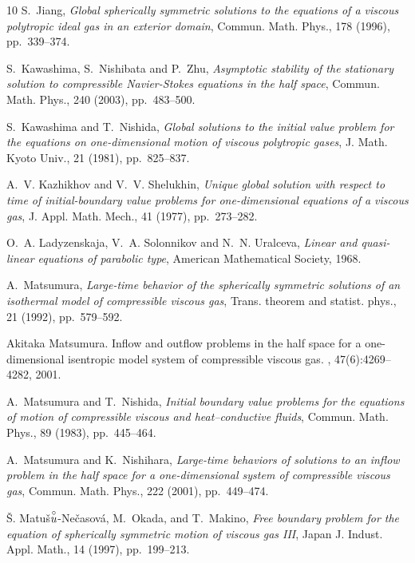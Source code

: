 \documentclass[a4paper,12pt,draft]{article}
\theoremstyle{remark}
\begin{document}
\begin{thebibliography}{10}
{\sc S.~Jiang}, {\em Global spherically symmetric solutions to the equations of
  a viscous polytropic ideal gas in an exterior domain}, Commun. Math. Phys.,
  178 (1996), pp.~339--374.

{\sc S.~Kawashima, S.~Nishibata and P.~Zhu}, {\em Asymptotic stability of the
  stationary solution to compressible {N}avier-{S}tokes equations in the half
  space}, Commun. Math. Phys., 240 (2003), pp.~483--500.

{\sc S.~Kawashima and T.~Nishida}, {\em Global solutions to the initial value
  problem for the equations on one-dimensional motion of viscous polytropic
  gases}, J. Math. Kyoto Univ., 21 (1981), pp.~825--837.

{\sc A.~V. Kazhikhov and V.~V. Shelukhin}, {\em Unique global solution with
  respect to time of initial-boundary value problems for one-dimensional
  equations of a viscous gas}, J. Appl. Math. Mech., 41 (1977), pp.~273--282.

{\sc O.~A. Ladyzenskaja, V.~A. Solonnikov and N.~N. Uralceva},
{\em Linear and quasi-linear equations of parabolic type},
  American Mathematical Society, 1968.

{\sc A.~Matsumura}, {\em Large-time behavior of the spherically symmetric
  solutions of an isothermal model of compressible viscous gas}, Trans. theorem
  and statist. phys., 21 (1992), pp.~579--592.

Akitaka Matsumura.
\newblock Inflow and outflow problems in the half space for a one-dimensional
  isentropic model system of compressible viscous gas.
,
  47(6):4269--4282, 2001.

{\sc A.~Matsumura and T.~Nishida}, {\em Initial boundary value problems for the
  equations of motion of compressible viscous and heat--conductive fluids},
  Commun. Math. Phys., 89 (1983), pp.~445--464.


{\sc A.~Matsumura and K.~Nishihara}, {\em Large-time behaviors of solutions to
  an inflow problem in the half space for a one-dimensional system of
  compressible viscous gas}, Commun. Math. Phys., 222 (2001), pp.~449--474.


{\sc
\v{S}. Matu\v{s}$\overset{\circ}{\textsc{u}}$-Ne\v{c}asov\'{a},
M.~Okada,
and T.~Makino},
{\em
  Free boundary problem for the equation of
  spherically symmetric motion of viscous gas III},
  Japan J. Indust. Appl. Math., 14
  (1997), pp.~199--213.
  

\end{thebibliography}
\end{document}
